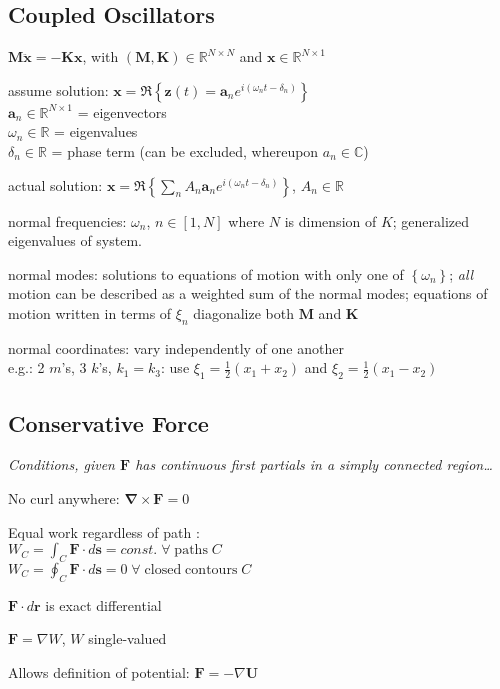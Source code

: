 \documentclass[letterpaper,landscape,10pt]{article}
\newenvironment{mydescription}
{\begin{description}
	\setlength{\itemsep}{0pt}
	\setlength{\parskip}{0pt}
	\setlength{\parsep}{-1pt}}
{\end{description}}
\begin{document}
{\begin{multicols}{3}
	\subsection*{Coupled Oscillators}
		\begin{mydescription}
		  \item[] $\bm{M\ddot x = -Kx}$, \hspace{5pt} with
			$(\bm{M,K})\in\mathbb{R}^{N\times N}$ and
			$\bm{x}\in\mathbb{R}^{N\times 1}$
		  \item[assume solution:] $\bm{x} = \Re \left\{
			\bm{z}(t)=\bm{a}_ne^{i\left(\omega_nt-\delta_n\right)} \right\}$\\
			$\bm{a}_n\in\mathbb{R}^{N\times 1}$ = eigenvectors \\
			$\omega_n\in\mathbb{R}$ = eigenvalues \\
			$\delta_n\in\mathbb{R}$ = phase term (can be excluded, whereupon
			  $a_n\in\mathbb{C}$) \\
		  \item[actual solution:]
			$\bm{x}=\Re\left\{\sum_nA_n\bm{a}_ne^{i\left(\omega_nt-\delta_n\right)}\right\}$,
			$A_n\in\mathbb{R}$
		  \item[normal frequencies:] $\omega_n$, $n\in[1,N]$ where $N$ is
			dimension of $K$; generalized eigenvalues of system.
		  \item[normal modes:] solutions to equations of motion with only one
			of $\left\{ \omega_n \right\}$; \emph{all} motion can be described
			as a weighted sum of the normal modes; equations of motion written
			in terms of $\xi_n$ diagonalize both $\bm{M}$ and $\bm{K}$
		  \item[normal coordinates:] vary independently of one another \\
			e.g.: 2 $m$'s, 3 $k$'s, $k_1=k_3$: use
			$\xi_1=\frac{1}{2}\left( x_1+x_2 \right)$ and
			$\xi_2=\frac{1}{2}\left( x_1-x_2 \right)$ 
		\end{mydescription}
		
	
	\subsection*{Conservative Force}
		\begin{mydescription}
			\item[\emph{Conditions, given $\bm{F}$ has continuous first partials in
			  a simply connected region\dots}]
			\item[No curl anywhere:]
				$\bm{\nabla}\times\bm{F}=0$
			\item[Equal work regardless of path]: \\
			  $W_C = \int_{C}\bm{F} \cdot d\bm{s} = const. \;\forall\;\mathrm{paths}\;C$\\
				$W_C = \oint_{C}\bm{F} \cdot d\bm{s} = 0 \;\forall\;\mathrm{closed\;contours}\;C$
			\item[$\bm{F} \cdot d\bm{r}$ is exact differential]
			\item[$\bm{F} = \nabla W$, $W$ single-valued]
			\item[Allows definition of potential:]
			  $\bm{F} = - \nabla \bm{U}$
		\end{mydescription}

\end{multicols}}
\end{document}
